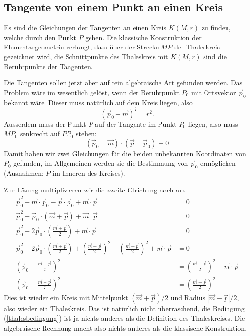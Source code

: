 %
%
\subsection{Tangente von einem Punkt an einen Kreis}
Es sind die Gleichungen der Tangenten an einen Kreis $K(M,r)$ zu finden,
welche durch den Punkt $P$ gehen.
Die klassische Konstruktion der
Elementargeometrie verlangt, dass über der Strecke $MP$ der
Thaleskreis gezeichnet wird, die Schnittpunkte des Thaleskreis mit
$K(M,r)$ sind die Berührpunkte der Tangenten.

Die Tangenten sollen jetzt aber auf rein algebraische Art gefunden
werden.
Das Problem wäre im wesentlich gelöst, wenn der Berührpunkt $P_0$
mit Ortsvektor
$\vec p_0$ bekannt wäre.
Dieser muss natürlich auf dem Kreis liegen,
also
\[
(\vec p_0-\vec m)^2=r^2.
\]
Ausserdem muss der Punkt $P$ auf der Tangente im Punkt $P_0$ liegen,
also muss $MP_0$ senkrecht auf $PP_0$ stehen:
\begin{equation}
(\vec p_0-\vec m)\cdot(\vec p-\vec p_0)=0
\label{thalesbedingung}
\end{equation}
Damit haben wir zwei Gleichungen für die beiden unbekannten Koordinaten
von $P_0$ gefunden, im Allgemeinen werden sie die Bestimmung von $\vec p_0$
ermöglichen (Ausnahmen: $P$ im Inneren des Kreises).

Zur Lösung multiplizieren wir die zweite Gleichung noch aus
\begin{align*}
\vec p_0^2-\vec m\cdot\vec p_0-\vec p\cdot\vec p_0+\vec m\cdot\vec p&=0
\\
\vec p_0^2-\vec p_0\cdot (\vec m+\vec p)+\vec m\cdot\vec p&=0
\\
\vec p_0^2-2\vec p_0\cdot \left(\frac{\vec m+\vec p}{2}\right)+\vec m\cdot\vec p&=0
\\
\vec p_0^2-2\vec p_0\cdot \left(\frac{\vec m+\vec p}{2}\right)+
\left(\frac{\vec m+\vec p}2\right)^2
-\left(\frac{\vec m+\vec p}2\right)^2
+\vec m\cdot\vec p&=0
\\
\left(\vec p_0- \frac{\vec m+\vec p}{2}\right)^2
&=
\left(\frac{\vec m+\vec p}2\right)^2
-\vec m\cdot\vec p
\\
\left(\vec p_0- \frac{\vec m+\vec p}{2}\right)^2
&=
\left(\frac{\vec m-\vec p}2\right)^2
\end{align*}
Dies ist wieder ein Kreis mit Mittelpunkt $(\vec m+\vec p)/2$ und
Radius $|\vec m-\vec p|/2$, also wieder ein Thaleskreis.
Das ist natürlich nicht überraschend, die Bedingung (\ref{thalesbedingung})
ist ja nichts anderes als die Definition des Thaleskreises.
Die algebraische Rechnung macht also nichts anderes als die klassische
Konstruktion.

